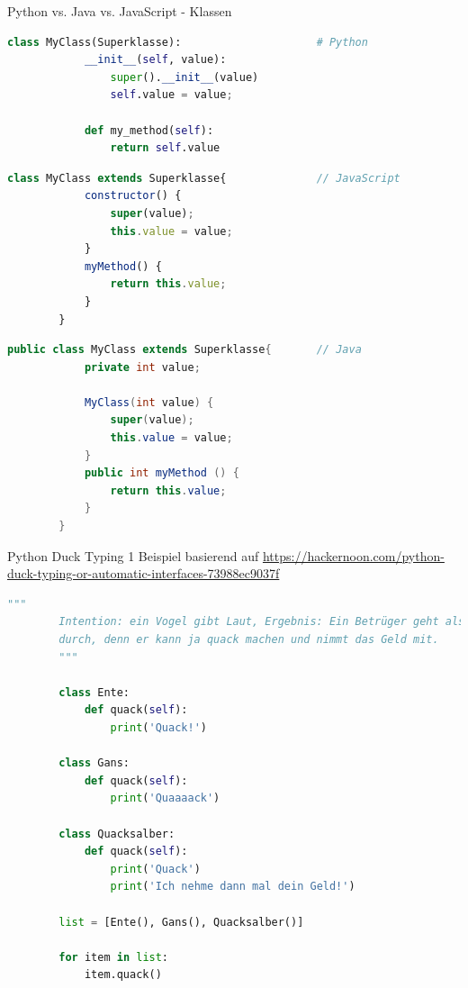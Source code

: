 \begin{frame}[fragile]{Python vs. Java vs. JavaScript - Klassen}
    \begin{lstlisting}[language=Python, gobble=8]
        class MyClass(Superklasse):                     # Python
            __init__(self, value):
                super().__init__(value)
                self.value = value;

            def my_method(self):
                return self.value
    \end{lstlisting}
    \begin{lstlisting}[language=JavaScript, gobble=8]
        class MyClass extends Superklasse{              // JavaScript
            constructor() {
                super(value);
                this.value = value;
            }
            myMethod() {
                return this.value;
            }
        }
    \end{lstlisting}
    \begin{lstlisting}[language=Java, gobble=8]
        public class MyClass extends Superklasse{       // Java
            private int value;

            MyClass(int value) {
                super(value);
                this.value = value;
            }
            public int myMethod () {
                return this.value;
            }
        }
    \end{lstlisting}
\end{frame}

\begin{frame}[fragile]{Python Duck Typing 1}
    Beispiel basierend auf \url{https://hackernoon.com/python-duck-typing-or-automatic-interfaces-73988ec9037f}

    \begin{lstlisting}[language=Python, gobble=8]
        """
        Intention: ein Vogel gibt Laut, Ergebnis: Ein Betrüger geht als Vogel
        durch, denn er kann ja quack machen und nimmt das Geld mit.
        """

        class Ente:
            def quack(self):
                print('Quack!')

        class Gans:
            def quack(self):
                print('Quaaaack')

        class Quacksalber:
            def quack(self):
                print('Quack')
                print('Ich nehme dann mal dein Geld!')

        list = [Ente(), Gans(), Quacksalber()]

        for item in list:
            item.quack()
    \end{lstlisting}
\end{frame}

